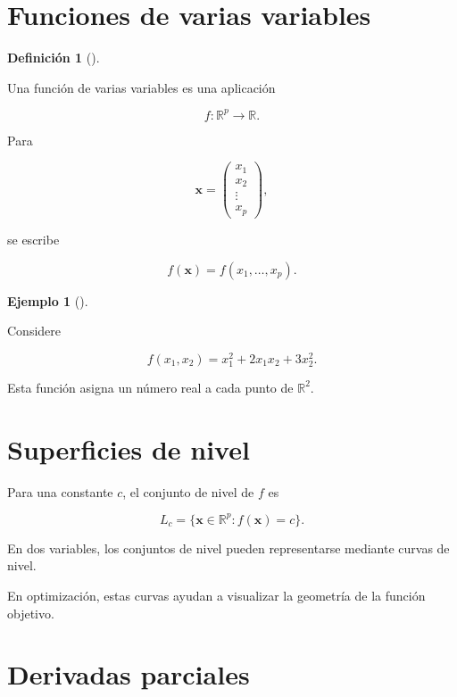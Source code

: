 \documentclass[
  spanish,
  11pt,
  letterpaper,
  DIV=11,
  numbers=noendperiod]{scrreprt}
\theoremstyle{definition}
\newtheorem{definition}{Definición}[chapter]
\theoremstyle{plain}
\theoremstyle{definition}
\newtheorem{example}{Ejemplo}[chapter]
\theoremstyle{remark}
\begin{document}
\section{Funciones de varias
variables}\label{funciones-de-varias-variables}

\begin{definition}[]\protect\hypertarget{def-funcion-multivariable}{}\label{def-funcion-multivariable}

Una función de varias variables es una aplicación

\[
f:\mathbb{R}^{p}\to\mathbb{R}.
\]

\end{definition}

Para

\[
\mathbf{x}
=
\begin{pmatrix}
x_1\\
x_2\\
\vdots\\
x_p
\end{pmatrix},
\]

se escribe

\[
f(\mathbf{x})
=
f(x_1,\ldots,x_p).
\]

\begin{example}[]\protect\hypertarget{exm-funcion-cuadratica}{}\label{exm-funcion-cuadratica}

Considere

\[
f(x_1,x_2)
=
x_1^2+2x_1x_2+3x_2^2.
\]

Esta función asigna un número real a cada punto de \(\mathbb{R}^{2}\).

\end{example}

\section{Superficies de nivel}\label{superficies-de-nivel}

Para una constante \(c\), el conjunto de nivel de \(f\) es

\[
L_c
=
\{
\mathbf{x}\in\mathbb{R}^{p}
:
f(\mathbf{x})=c
\}.
\]

En dos variables, los conjuntos de nivel pueden representarse mediante
curvas de nivel.

En optimización, estas curvas ayudan a visualizar la geometría de la
función objetivo.

\section{Derivadas parciales}\label{derivadas-parciales}
\end{document}
